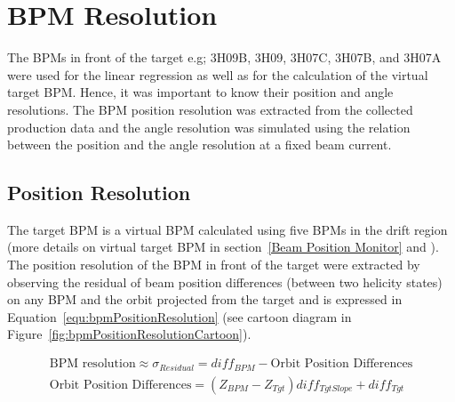 \section{BPM Resolution}
\label{BPM Resolution}

The BPMs in front of the target e.g; 3H09B, 3H09, 3H07C, 3H07B, and 3H07A were used for the linear regression as well as for the calculation of the virtual target BPM.  Hence, it was important to know their position and angle resolutions. The BPM position resolution was extracted from the collected production data and the angle resolution was simulated using the relation between the position and the angle resolution at a fixed beam current.

\subsection{Position Resolution}
\label{Position Resolution}
The target BPM is a virtual BPM calculated using five BPMs in the drift region (more details on virtual target BPM in section~\ref{Beam Position Monitor} and \cite{buddhini_qweak}). The position resolution of the BPM in front of the target were extracted by observing the residual of beam position differences (between two helicity states) on any BPM and the orbit projected from the target and is expressed in Equation~\ref{equ:bpmPositionResolution} (see cartoon diagram in Figure~\ref{fig:bpmPositionResolutionCartoon}). 

\begin{equation} \label{equ:bpmPositionResolution}
\begin{split}
\text{BPM resolution} \approx \sigma_{Residual} = diff_{BPM} - \text{Orbit Position Differences} \\
\text{Orbit Position Differences} = (Z_{BPM} - Z_{Tgt}) diff_{TgtSlope} + diff_{Tgt}
\end{split}
\end{equation}



